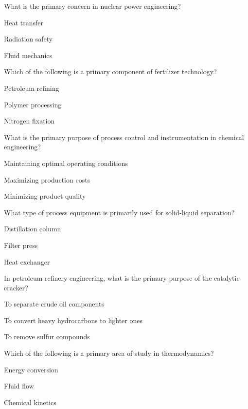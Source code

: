 \begin{enhancedmcq}{What is the primary concern in nuclear power engineering?}
\item Heat transfer
\item Radiation safety
\item Fluid mechanics

\end{enhancedmcq}
\begin{enhancedmcq}{Which of the following is a primary component of fertilizer technology?}
\item Petroleum refining
\item Polymer processing
\item Nitrogen fixation

\end{enhancedmcq}
\begin{enhancedmcq}{What is the primary purpose of process control and instrumentation in chemical engineering?}
\item Maintaining optimal operating conditions
\item Maximizing production costs
\item Minimizing product quality

\end{enhancedmcq}
\begin{enhancedmcq}{What type of process equipment is primarily used for solid‑liquid separation?}
\item Distillation column
\item Filter press
\item Heat exchanger

\end{enhancedmcq}
\begin{enhancedmcq}{In petroleum refinery engineering, what is the primary purpose of the catalytic cracker?}
\item To separate crude oil components
\item To convert heavy hydrocarbons to lighter ones
\item To remove sulfur compounds

\end{enhancedmcq}
\begin{enhancedmcq}{Which of the following is a primary area of study in thermodynamics?}
\item Energy conversion
\item Fluid flow
\item Chemical kinetics

\end{enhancedmcq}
